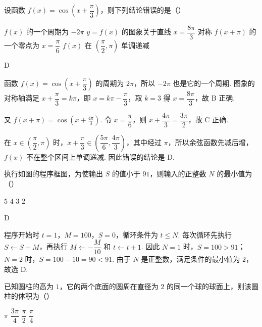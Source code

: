 \begin{problem}
设函数 \(f(x)=\cos\!\left(x+\dfrac{\pi}{3}\right)\)，则下列结论错误的是（\quad）

\choices
    {\(f(x)\) 的一个周期为 \(-2\pi\)}
    {\(y=f(x)\) 的图象关于直线 \(x=\dfrac{8\pi}{3}\) 对称}
    {\(f(x+\pi)\) 的一个零点为 \(x=\dfrac{\pi}{6}\)}
    {\(f(x)\) 在 \(\left(\dfrac{\pi}{2},\pi\right)\) 单调递减}
\end{problem}

\begin{answer}
D
\end{answer}

\begin{solution}
函数 \(f(x)=\cos\left(x+\dfrac\pi3\right)\) 的周期为 \(2\pi\)，所以 \(-2\pi\) 也是它的一个周期. 图象的对称轴满足 \(x+\dfrac\pi3=k\pi\)，即 \(x=k\pi-\dfrac\pi3\)，取 \(k=3\) 得 \(x=\dfrac{8\pi}{3}\)，故 B 正确.

又 \(f(x+\pi)=\cos\left(x+\frac{4\pi}{3}\right)\).
令 \(x=\dfrac\pi6\)，则 \(x+\dfrac{4\pi}{3}=\dfrac{3\pi}{2}\)，故 C 正确.

在 \(x\in\left(\dfrac\pi2,\pi\right)\) 时，\(x+\dfrac\pi3\in\left(\dfrac{5\pi}{6},\dfrac{4\pi}{3}\right)\)，其中经过 \(\pi\)，所以余弦函数先减后增，\(f(x)\) 不在整个区间上单调递减. 因此错误的结论是 D.
\end{solution}

\begin{problem}
执行如图的程序框图，为使输出 \(S\) 的值小于 \(91\)，则输入的正整数 \(N\) 的最小值为（\quad）


\choices
    {\(5\)}
    {\(4\)}
    {\(3\)}
    {\(2\)}
\end{problem}

\begin{answer}
D
\end{answer}

\begin{solution}
程序开始时 \(t=1\)，\(M=100\)，\(S=0\)，循环条件为 \(t\le N\). 每次循环先执行 \(S\leftarrow S+M\)，再执行 \(M\leftarrow-\dfrac{M}{10}\) 和 \(t\leftarrow t+1\). 因此 \(N=1\) 时，\(S=100>91\)；\(N=2\) 时，\(S=100-10=90<91\). 由于 \(N\) 是正整数，满足条件的最小值为 \(2\)，故选 D.
\end{solution}

\begin{problem}
已知圆柱的高为 \(1\)，它的两个底面的圆周在直径为 \(2\) 的同一个球的球面上，则该圆柱的体积为（\quad）

\choices
    {\(\pi\)}
    {\(\dfrac{3\pi}{4}\)}
    {\(\dfrac{\pi}{2}\)}
    {\(\dfrac{\pi}{4}\)}
\end{problem}

